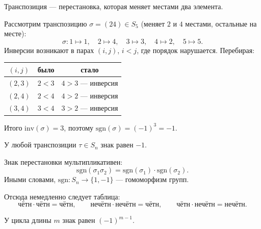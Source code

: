 \begin{definition}
    Транспозиция --- перестановка, которая меняет местами два элемента.
\end{definition}
 
\begin{example}
    Рассмотрим транспозицию $\sigma = (24) \in S_5$ (меняет $2$ и $4$ местами, остальные на месте):
    \[
        \sigma\colon 1 \mapsto 1,\quad 2 \mapsto 4,\quad 3 \mapsto 3,\quad 4 \mapsto 2,\quad 5 \mapsto 5.
    \]
    Инверсии возникают в парах $(i,j)$, $i < j$, где порядок нарушается. Перебирая:
    \begin{center}
    \begin{tabular}{c|c|c}
        $(i,j)$ & было & стало \\
        \hline
        $(2,3)$ & $2 < 3$ & $4 > 3$ --- инверсия \\
        $(2,4)$ & $2 < 4$ & $4 > 2$ --- инверсия \\
        $(3,4)$ & $3 < 4$ & $3 > 2$ --- инверсия \\
    \end{tabular}
    \end{center}
    Итого $\mathrm{inv}(\sigma) = 3$, поэтому $\mathrm{sgn}(\sigma) = (-1)^3 = -1$.
\end{example}
 
\begin{stmt}
    У любой транспозиции $\tau \in S_n$ знак равен $-1$.
\end{stmt}
 
\begin{stmt}
    Знак перестановки мультипликативен:
    \[
        \mathrm{sgn}(\sigma_1 \sigma_2) = \mathrm{sgn}(\sigma_1)\cdot\mathrm{sgn}(\sigma_2).
    \]
    Иными словами, $\mathrm{sgn}\colon S_n \to \{1,-1\}$ --- гомоморфизм групп.
 
    Отсюда немедленно следует таблица:
    \[
        \text{чётн} \cdot \text{чётн} = \text{чётн}, \qquad
        \text{нечётн} \cdot \text{нечётн} = \text{чётн}, \qquad
        \text{чётн} \cdot \text{нечётн} = \text{нечётн}.
    \]
\end{stmt}
 
\begin{stmt}
    У цикла длины $m$ знак равен $(-1)^{m-1}$.
\end{stmt}
 
